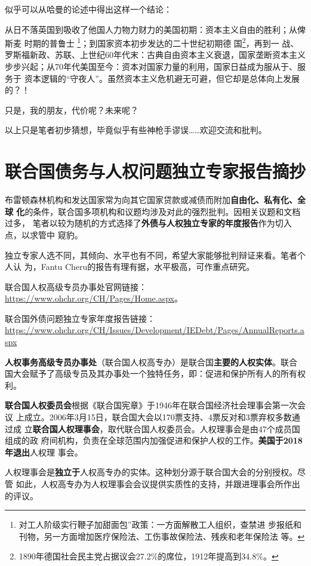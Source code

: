 似乎可以从哈曼的论述中得出这样一个结论：

从日不落英国到吸收了他国人力物力财力的美国初期：资本主义自由的胜利；从俾斯麦
时期的普鲁士 \footnote{对工人阶级实行鞭子加甜面包”政策：一方面解散工人组织，查禁进
  步报纸和刊物，另一方面增加医疗保险法、工伤事故保险法、残疾和老年保险法
  等。\cite[75]{zhuzhaiwenti}}；到国家资本初步发达的二十世纪初期德
国\footnote{1890年德国社会民主党占据议会27.2\%的席位，1912年提高到34.8\%。}，再到一
战、罗斯福新政、苏联、上世纪60年代末：古典自由资本主义衰退，国家垄断资本主义
步步兴起；从70年代美国至今：资本对国家力量的利用，国家日益成为服从于、服务于
资本逻辑的“守夜人”。虽然资本主义危机避无可避，但它却是总体向上发展的？！

只是，我的朋友，代价呢？未来呢？

以上只是笔者初步猜想，毕竟似乎有些神枪手谬误……欢迎交流和批判。


\section[联合国债务与人权独立专家报告]{联合国债务与人权问题独立专家报告摘抄}

布雷顿森林机构和发达国家常为向其它国家贷款或减债而附加\textbf{自由化、私有化、全球
  化}的条件，联合国多项机构和议题均涉及对此的强烈批判。因相关议题和文档过多，
笔者以较为随机的方式选择了\textbf{外债与人权独立专家的年度报告}作为切入点，以求管中
窥豹。

独立专家人选不同，其倾向、水平也有不同，希望大家能够批判辩证来看。笔者个人认
为，Fantu Cheru的报告有理有据，水平极高，可作重点研究。

联合国人权高级专员办事处官网链接：\url{https://www.ohchr.org/CH/Pages/Home.aspx}。

联合国外债问题独立专家年度报告链接：\url{https://www.ohchr.org/CH/Issues/Development/IEDebt/Pages/AnnualReports.aspx}


\textbf{人权事务高级专员办事处}（联合国人权高专办）是联合国\textbf{主要的人权实体}。联合
国大会赋予了高级专员及其办事处一个独特任务，即：促进和保护所有人的所有权利。

\textbf{联合国人权委员会}根据《联合国宪章》于1946年在联合国经济社会理事会第一次会议
上成立。2006年3月15日，联合国大会以170票支持、4票反对和3票弃权多数通过成
立\textbf{联合国人权理事会}，取代联合国人权委员会。人权理事会是由47个成员国组成的政
府间机构，负责在全球范围内加强促进和保护人权的工作。\textbf{美国于2018年退出}人权理
事会。

人权理事会是\textbf{独立于}人权高专办的实体。这种划分源于联合国大会的分别授权。尽管
如此，人权高专办为人权理事会会议提供实质性的支持，并跟进理事会所作出的评议。

